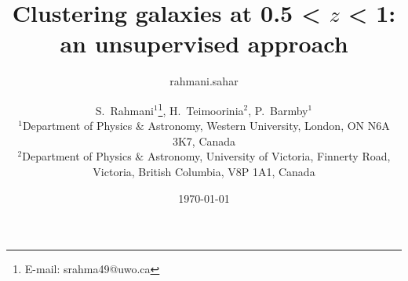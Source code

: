 \documentclass[useAMS,usenatbib]{mn2e}
\begin{document}

\title[SOM: classifying high $Z$ galaxies]{Clustering galaxies at 0.5 < $z$ < 1: an unsupervised approach}
\author{rahmani.sahar }
\date{\today}
\author[S.~Rahmani, H.~Teimoorinia and P.~Barmby]{S.~Rahmani$^{1}$\thanks{E-mail:
srahma49@uwo.ca}, H.~Teimoorinia$^{2}$, P.~Barmby$^{1}$\\
$^{1}$Department of Physics $\&$ Astronomy, Western University, London, ON N6A 3K7, Canada\\
$^{2}$Department of Physics $\&$ Astronomy, University of Victoria, Finnerty Road, Victoria, British Columbia, V8P 1A1, Canada}
\maketitle

\end{document}
